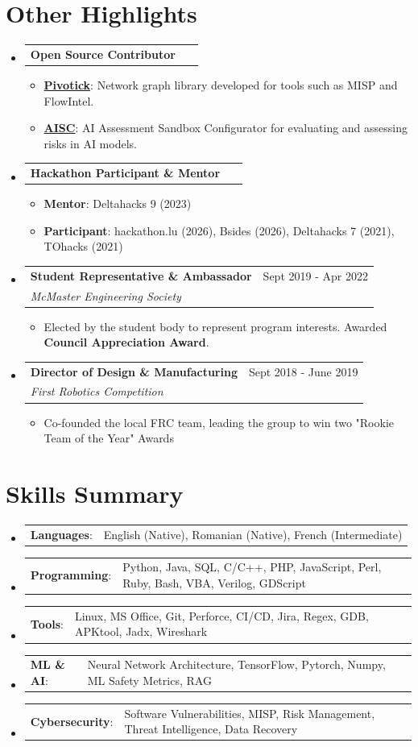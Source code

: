 \documentclass[a4paper,11pt]{article}
\makeatletter
\newcommand{\headingFour}[4]{
	\item
	\begin{tabular*}{0.97\textwidth}{l@{\extracolsep{\fill}}r}
	\textbf{\large\textcolor{customBlue}{#1}} & {#2} \\
	\textit{#3} & \textit{#4} \\
	\end{tabular*}\vspace{-6pt}
}
\newcommand{\headingTwo}[2]{
	\item
	\begin{tabular*}{0.97\textwidth}{l@{\extracolsep{\fill}}r}
	\textbf{\large\textcolor{customBlue}{#1}} & {#2} \\
	\end{tabular*}\vspace{-6pt}
}
\newcommand{\skill}[2]{
	\item
	\begin{tabular*}{0.97\textwidth}{>{\raggedright\arraybackslash}p{3cm}@{}l}
	\textbf{#1}: & {#2} \\
	\end{tabular*}\vspace{-5pt}
}
\makeatother
\begin{document}
\section{Other Highlights}
\begin{itemize}[leftmargin=*]
\headingTwo{Open Source Contributor}{~}
\begin{itemize}
	\item{\href{https://github.com/Pivotick/Pivotick}{\textbf{Pivotick}}: Network graph library developed for tools such as MISP and FlowIntel.}\vspace{-2pt}
	\item{\href{https://github.com/lux-ai-factory/aisc}{\textbf{AISC}}: AI Assessment Sandbox Configurator for evaluating and assessing risks in AI models.}\vspace{-2pt}
\end{itemize}

\headingTwo{Hackathon Participant \& Mentor}{~}
\begin{itemize}
	\item{\textbf{Mentor}: Deltahacks 9 (2023)}\vspace{-2pt}
	\item{\textbf{Participant}: hackathon.lu (2026), Bsides (2026), Deltahacks 7 (2021), TOhacks (2021)}\vspace{-2pt}
\end{itemize}

\headingFour{Student Representative \& Ambassador}{Sept 2019 - Apr 2022}
{McMaster Engineering Society}{~}
\begin{itemize}
	\item{Elected by the student body to represent program interests. Awarded \textbf{Council Appreciation Award}.}
\end{itemize}

\headingFour{Director of Design \& Manufacturing}{Sept 2018 - June 2019}
{First Robotics Competition}{~}
\begin{itemize}
	\item{Co-founded the local FRC team, leading the group to win two "Rookie Team of the Year" Awards}\vspace{-2pt}
\end{itemize}

\end{itemize}


\section{Skills Summary}
\begin{itemize}[leftmargin=*]
	\skill{Languages}{English (Native), Romanian (Native), French (Intermediate)}
	\skill{Programming}{Python, Java, SQL, C/C++, PHP, JavaScript, Perl, Ruby, Bash, VBA, Verilog, GDScript}
	\skill{Tools}{Linux, MS Office, Git, Perforce, CI/CD, Jira, Regex, GDB, APKtool, Jadx, Wireshark}
	\skill{ML \& AI}{Neural Network Architecture, TensorFlow, Pytorch, Numpy, ML Safety Metrics, RAG}
	\skill{Cybersecurity}{Software Vulnerabilities, MISP, Risk Management, Threat Intelligence, Data Recovery}
\end{itemize}
\end{document}
